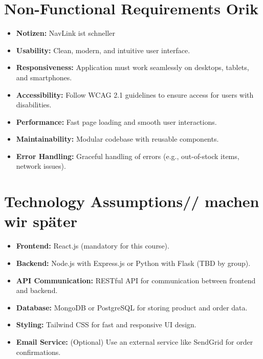 \documentclass[a4paper,12pt]{article}
\begin{document}
	\section{Non-Functional Requirements Orik}
	\begin{itemize}
			\item \textbf{Notizen:} NavLink ist schneller
		\item \textbf{Usability:} Clean, modern, and intuitive user interface.
		\item \textbf{Responsiveness:} Application must work seamlessly on desktops, tablets, and smartphones.
		\item \textbf{Accessibility:} Follow WCAG 2.1 guidelines to ensure access for users with disabilities.
		\item \textbf{Performance:} Fast page loading and smooth user interactions.
		\item \textbf{Maintainability:} Modular codebase with reusable components.
		\item \textbf{Error Handling:} Graceful handling of errors (e.g., out-of-stock items, network issues).
	\end{itemize}
	
	\section{Technology Assumptions// machen wir später}
	\begin{itemize}
		\item \textbf{Frontend:} React.js (mandatory for this course).
		\item \textbf{Backend:} Node.js with Express.js or Python with Flask (TBD by group).
		\item \textbf{API Communication:} RESTful API for communication between frontend and backend.
		\item \textbf{Database:} MongoDB or PostgreSQL for storing product and order data.
		\item \textbf{Styling:} Tailwind CSS for fast and responsive UI design.
		\item \textbf{Email Service:} (Optional) Use an external service like SendGrid for order confirmations.
	\end{itemize}
	
\end{document}
